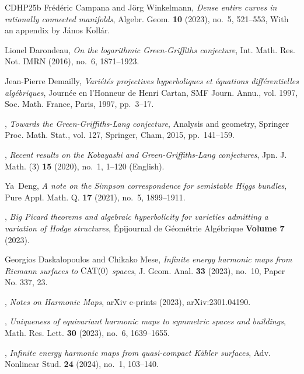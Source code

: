 \documentclass[english]{amsproc}
\theoremstyle{plain}
\theoremstyle{definition}
\theoremstyle{remark}
\theoremstyle{plain}
\numberwithin{equation}{thm} %
\begin{document}
\begin{thebibliography}{CDHP25b}
		Fr\'ed\'eric Campana and J\"org Winkelmann, \emph{Dense entire curves in
			rationally connected manifolds}, Algebr. Geom. \textbf{10} (2023), no.~5,
		521--553, With an appendix by J\'anos Koll\'ar. 
		
		Lionel Darondeau, \emph{On the logarithmic {G}reen-{G}riffiths conjecture},
		Int. Math. Res. Not. IMRN (2016), no.~6, 1871--1923. 
		
		Jean-Pierre Demailly, \emph{Vari\'et\'es projectives hyperboliques et
			\'equations diff\'erentielles alg\'ebriques}, Journ\'ee en l'{H}onneur de
		{H}enri {C}artan, SMF Journ. Annu., vol. 1997, Soc. Math. France, Paris,
		1997, pp.~3--17. 
		
		\bysame, \emph{Towards the {G}reen-{G}riffiths-{L}ang conjecture}, Analysis and
		geometry, Springer Proc. Math. Stat., vol. 127, Springer, Cham, 2015,
		pp.~141--159. 
		
		\bysame, \emph{Recent results on the {Kobayashi} and {Green}-{Griffiths}-{Lang}
			conjectures}, Jpn. J. Math. (3) \textbf{15} (2020), no.~1, 1--120 (English).
		
		Ya~{Deng}, \emph{A note on the {S}impson correspondence for semistable {H}iggs
			bundles}, Pure Appl. Math. Q. \textbf{17} (2021), no.~5, 1899--1911.
		
		\bysame, \emph{{Big Picard theorems and algebraic hyperbolicity for varieties
				admitting a variation of Hodge structures}}, {Épijournal de Géométrie
			Algébrique} \textbf{{Volume 7}} (2023).
		
		Georgios Daskalopoulos and Chikako Mese, \emph{Infinite energy harmonic maps
			from {R}iemann surfaces to {$\rm CAT(0)$} spaces}, J. Geom. Anal. \textbf{33}
		(2023), no.~10, Paper No. 337, 23. 
		
		\bysame, \emph{{Notes on Harmonic Maps}}, arXiv e-prints (2023),
		arXiv:2301.04190.
		
		\bysame, \emph{Uniqueness of equivariant harmonic maps to symmetric spaces and
			buildings}, Math. Res. Lett. \textbf{30} (2023), no.~6, 1639--1655.
		
		\bysame, \emph{Infinite energy harmonic maps from quasi-compact {K}\"ahler
			surfaces}, Adv. Nonlinear Stud. \textbf{24} (2024), no.~1, 103--140.
		

\end{thebibliography}
\end{document}
